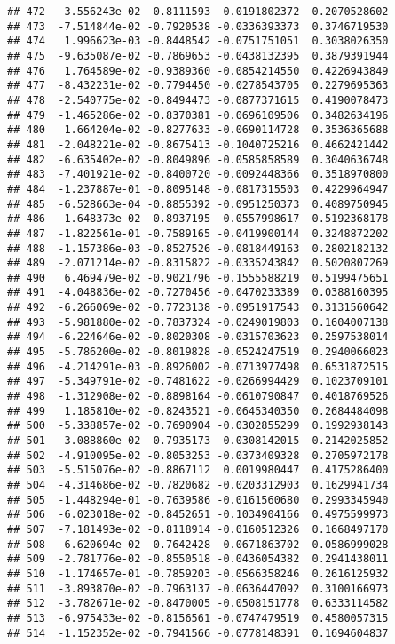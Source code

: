 \documentclass[
]{article}
\begin{document}
\begin{verbatim}
## 472  -3.556243e-02 -0.8111593  0.0191802372  0.2070528602
## 473  -7.514844e-02 -0.7920538 -0.0336393373  0.3746719530
## 474   1.996623e-03 -0.8448542 -0.0751751051  0.3038026350
## 475  -9.635087e-02 -0.7869653 -0.0438132395  0.3879391944
## 476   1.764589e-02 -0.9389360 -0.0854214550  0.4226943849
## 477  -8.432231e-02 -0.7794450 -0.0278543705  0.2279695363
## 478  -2.540775e-02 -0.8494473 -0.0877371615  0.4190078473
## 479  -1.465286e-02 -0.8370381 -0.0696109506  0.3482634196
## 480   1.664204e-02 -0.8277633 -0.0690114728  0.3536365688
## 481  -2.048221e-02 -0.8675413 -0.1040725216  0.4662421442
## 482  -6.635402e-02 -0.8049896 -0.0585858589  0.3040636748
## 483  -7.401921e-02 -0.8400720 -0.0092448366  0.3518970800
## 484  -1.237887e-01 -0.8095148 -0.0817315503  0.4229964947
## 485  -6.528663e-04 -0.8855392 -0.0951250373  0.4089750945
## 486  -1.648373e-02 -0.8937195 -0.0557998617  0.5192368178
## 487  -1.822561e-01 -0.7589165 -0.0419900144  0.3248872202
## 488  -1.157386e-03 -0.8527526 -0.0818449163  0.2802182132
## 489  -2.071214e-02 -0.8315822 -0.0335243842  0.5020807269
## 490   6.469479e-02 -0.9021796 -0.1555588219  0.5199475651
## 491  -4.048836e-02 -0.7270456 -0.0470233389  0.0388160395
## 492  -6.266069e-02 -0.7723138 -0.0951917543  0.3131560642
## 493  -5.981880e-02 -0.7837324 -0.0249019803  0.1604007138
## 494  -6.224646e-02 -0.8020308 -0.0315703623  0.2597538014
## 495  -5.786200e-02 -0.8019828 -0.0524247519  0.2940066023
## 496  -4.214291e-03 -0.8926002 -0.0713977498  0.6531872515
## 497  -5.349791e-02 -0.7481622 -0.0266994429  0.1023709101
## 498  -1.312908e-02 -0.8898164 -0.0610790847  0.4018769526
## 499   1.185810e-02 -0.8243521 -0.0645340350  0.2684484098
## 500  -5.338857e-02 -0.7690904 -0.0302855299  0.1992938143
## 501  -3.088860e-02 -0.7935173 -0.0308142015  0.2142025852
## 502  -4.910095e-02 -0.8053253 -0.0373409328  0.2705972178
## 503  -5.515076e-02 -0.8867112  0.0019980447  0.4175286400
## 504  -4.314686e-02 -0.7820682 -0.0203312903  0.1629941734
## 505  -1.448294e-01 -0.7639586 -0.0161560680  0.2993345940
## 506  -6.023018e-02 -0.8452651 -0.1034904166  0.4975599973
## 507  -7.181493e-02 -0.8118914 -0.0160512326  0.1668497170
## 508  -6.620694e-02 -0.7642428 -0.0671863702 -0.0586999028
## 509  -2.781776e-02 -0.8550518 -0.0436054382  0.2941438011
## 510  -1.174657e-01 -0.7859203 -0.0566358246  0.2616125932
## 511  -3.893870e-02 -0.7963137 -0.0636447092  0.3100166973
## 512  -3.782671e-02 -0.8470005 -0.0508151778  0.6333114582
## 513  -6.975433e-02 -0.8156561 -0.0747479519  0.4580057315
## 514  -1.152352e-02 -0.7941566 -0.0778148391  0.1694604837

\end{verbatim}
\end{document}
